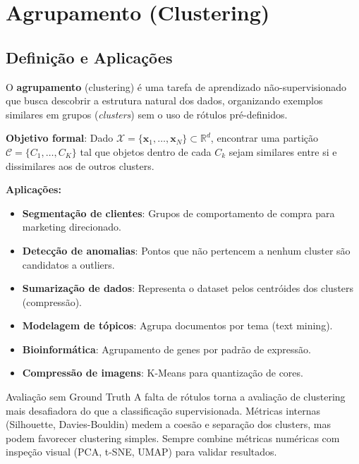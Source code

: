\documentclass[12pt,a4paper]{article}
\begin{document}
\section{Agrupamento (Clustering)}

\subsection{Definição e Aplicações}

O \textbf{agrupamento} (clustering) é uma tarefa de aprendizado não-supervisionado que busca descobrir a estrutura natural dos dados, organizando exemplos similares em grupos (\textit{clusters}) sem o uso de rótulos pré-definidos.

\textbf{Objetivo formal}: Dado $\mathcal{X} = \{\mathbf{x}_1, \ldots, \mathbf{x}_N\} \subset \mathbb{R}^d$, encontrar uma partição $\mathcal{C} = \{C_1, \ldots, C_K\}$ tal que objetos dentro de cada $C_k$ sejam similares entre si e dissimilares aos de outros clusters.

\textbf{Aplicações:}
\begin{itemize}
  \item \textbf{Segmentação de clientes}: Grupos de comportamento de compra para marketing direcionado.
  \item \textbf{Detecção de anomalias}: Pontos que não pertencem a nenhum cluster são candidatos a outliers.
  \item \textbf{Sumarização de dados}: Representa o dataset pelos centróides dos clusters (compressão).
  \item \textbf{Modelagem de tópicos}: Agrupa documentos por tema (text mining).
  \item \textbf{Bioinformática}: Agrupamento de genes por padrão de expressão.
  \item \textbf{Compressão de imagens}: K-Means para quantização de cores.
\end{itemize}

\begin{dicabox}{Avaliação sem Ground Truth}
A falta de rótulos torna a avaliação de clustering mais desafiadora do que a classificação supervisionada. Métricas internas (Silhouette, Davies-Bouldin) medem a coesão e separação dos clusters, mas podem favorecer clustering simples. Sempre combine métricas numéricas com inspeção visual (PCA, t-SNE, UMAP) para validar resultados.
\end{dicabox}
\end{document}
